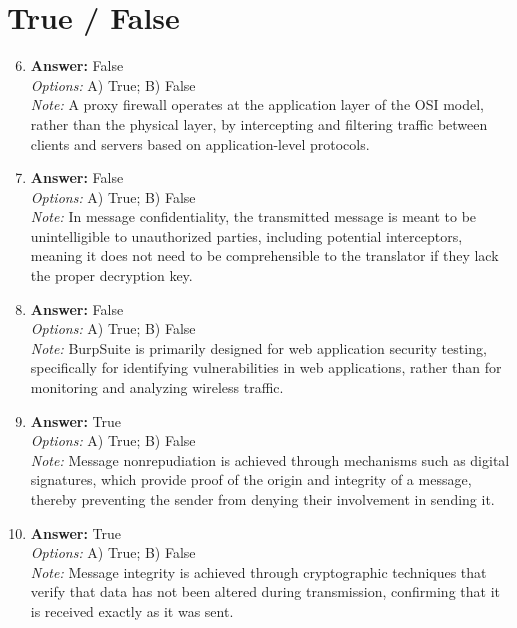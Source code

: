 \documentclass[12pt]{article}
\begin{document}
\section*{True / False}
\begin{enumerate}[label=\arabic*.]
\setcounter{enumi}{5}
\item \textbf{Answer:} False
\\ \textit{Options:} A) True; B) False
\\ \textit{Note:} A proxy firewall operates at the application layer of the OSI model, rather than the physical layer, by intercepting and filtering traffic between clients and servers based on application-level protocols.
\item \textbf{Answer:} False
\\ \textit{Options:} A) True; B) False
\\ \textit{Note:} In message confidentiality, the transmitted message is meant to be unintelligible to unauthorized parties, including potential interceptors, meaning it does not need to be comprehensible to the translator if they lack the proper decryption key.
\item \textbf{Answer:} False
\\ \textit{Options:} A) True; B) False
\\ \textit{Note:} BurpSuite is primarily designed for web application security testing, specifically for identifying vulnerabilities in web applications, rather than for monitoring and analyzing wireless traffic.
\item \textbf{Answer:} True
\\ \textit{Options:} A) True; B) False
\\ \textit{Note:} Message nonrepudiation is achieved through mechanisms such as digital signatures, which provide proof of the origin and integrity of a message, thereby preventing the sender from denying their involvement in sending it.
\item \textbf{Answer:} True
\\ \textit{Options:} A) True; B) False
\\ \textit{Note:} Message integrity is achieved through cryptographic techniques that verify that data has not been altered during transmission, confirming that it is received exactly as it was sent.
\end{enumerate}
\end{document}
